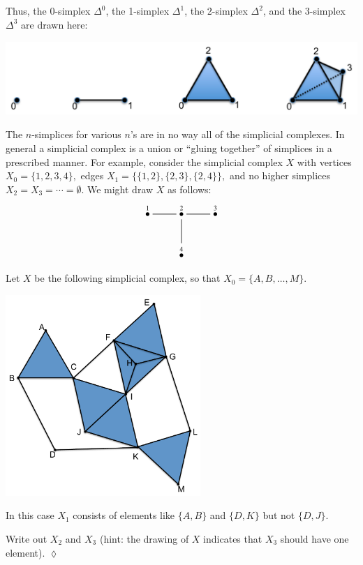 \documentclass[a4paper]{book}
\newcommand{\LMO}[1]{\stackrel{#1}{\bullet}}
\theoremstyle{myth}
\newtheorem{excENG}[envENG]{\begin{english}Exercise\end{english}}
\newenvironment{exerciseENG}{\begin{excENG}}{\hspace*{\fill}$\lozenge$\end{excENG}}
\begin{document}
\begin{russian}
 

Thus, the 0-simplex $\Delta^0$, the 1-simplex $\Delta^1$, the 2-simplex $\Delta^2$, and the 3-simplex $\Delta^3$ are drawn here:
\begin{center}
\includegraphics[height=1.1in]{simplices}
\end{center} 

 

The $n$-simplices for various $n$'s are in no way all of the simplicial complexes. In general a simplicial complex is a union or “gluing together” of simplices in a prescribed manner. For example, consider the simplicial complex $X$ with vertices $X_0=\{1,2,3,4\},$ edges $X_1=\{\{1,2\},\{2,3\},\{2,4\}\},$ and no higher simplices $X_2=X_3=\cdots=\emptyset$. We might draw $X$ as follows:
$$\xymatrix{\LMO{1}\ar@{-}[r]&\LMO{2}\ar@{-}[r]\ar@{-}[d]&\LMO{3}\\&\LMO{4}}$$

 

\begin{exerciseENG}
Let $X$ be the following simplicial complex, so that $X_0=\{A,B,\ldots,M\}$. 
\begin{center}
\includegraphics[height=3in]{OlogNetwork5}
\end{center} 
In this case $X_1$ consists of elements like $\{A,B\}$ and $\{D,K\}$ but not $\{D,J\}$. 

Write out $X_2$ and $X_3$ (hint: the drawing of $X$ indicates that $X_3$ should have one element).
\end{exerciseENG}


\end{russian}
\end{document}

